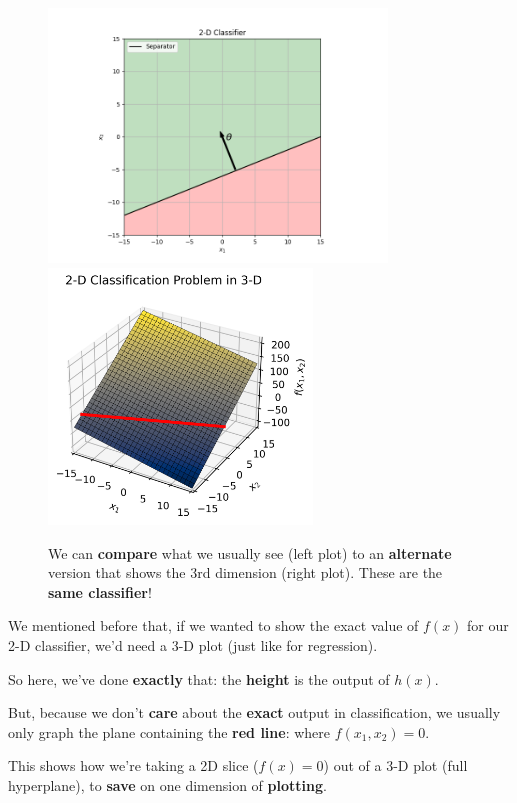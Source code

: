         \begin{figure}[H]
            \includegraphics[width=90mm,scale=0.5]{images/classification_images/2d_classifier_to_make_3d.png}
            \includegraphics[width=70mm,scale=0.5]{images/classification_images/2d_classification_in_3d.png}
            \caption*{We can \textbf{compare} what we usually see (left plot) to an \textbf{alternate} version that shows the 3rd dimension (right plot). These are the \textbf{same classifier}!}
        \end{figure}
        
        We mentioned before that, if we wanted to show the exact value of $f(x)$ for our 2-D classifier, we'd need a 3-D plot (just like for regression).
        
        So here, we've done \textbf{exactly} that: the \textbf{height} is the output of $h(x)$.
        
        But, because we don't \textbf{care} about the \textbf{exact} output in classification, we usually only graph the plane containing the \textbf{red line}: where $f(x_1,x_2)=0$.
        
        This shows how we're taking a 2D slice ($f(x)=0$) out of a 3-D plot (full hyperplane), to \textbf{save} on one dimension of \textbf{plotting}.
    
